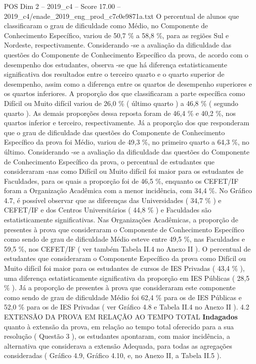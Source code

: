 \begin{textsample}{POS Dim 2 – 2019\_c4 – Score 17.00 – 2019\_c4/enade\_2019\_eng\_prod\_c7c0e9871a.txt}
O percentual de alunos que classificaram o grau de dificuldade como Médio, no Componente de Conhecimento Específico, variou de 50,7 \% a 58,8 \%, para as regiões Sul e Nordeste, respectivamente.
Considerando -se a avaliação da dificuldade das questões do Componente de Conhecimento Específico da prova, de acordo com o desempenho dos estudantes, observa -se que há diferença estatisticamente significativa dos resultados entre o terceiro quarto e o quarto superior de desempenho, assim como a diferença entre os quartos de desempenho superiores e os quartos inferiores.
A proporção dos que classificaram a parte específica como Difícil ou Muito difícil variou de 26,0 \% ( último quarto ) a 46,8 \% ( segundo quarto ).
As demais proporções dessa reposta foram de 46,4 \% e 40,2 \%, nos quartos inferior e terceiro, respectivamente.
Já a proporção dos que responderam que o grau de dificuldade das questões do Componente de Conhecimento Específico da prova foi Médio, variou de 49,3 \%, no primeiro quarto a 64,3 \%, no último.
Considerando -se a avaliação da dificuldade das questões do Componente de Conhecimento Específico da prova, o percentual de estudantes que consideraram -nas como Difícil ou Muito difícil foi maior para os estudantes de Faculdades, para os quais a proporção foi de 46,5 \%, enquanto os CEFET/IF foram a Organização Acadêmica com a menor incidência, com 34,4 \%.
No Gráfico 4.7, é possível observar que as diferenças das Universidades ( 34,7 \% ) e CEFET/IF e dos Centros Universitários ( 44,8 \% ) e Faculdades são estatisticamente significativas.
Nas Organizações Acadêmicas, a proporção de presentes à prova que consideraram o Componente de Conhecimento Específico como sendo de grau de dificuldade Médio esteve entre 49,5 \%, nas Faculdades e 59,5 \%, nos CEFET/IF ( ver também Tabela II.4 no Anexo II ).
O percentual de estudantes que consideraram o Componente Específico da prova como Difícil ou Muito difícil foi maior para os estudantes de cursos de IES Privadas ( 43,4 \% ), uma diferença estatisticamente significativa da proporção em IES Públicas ( 28,5 \% ).
Já a proporção de presentes à prova que consideraram este componente como sendo de grau de dificuldade Médio foi 62,4 \% para os de IES Públicas e 52,0 \% para os de IES Privadas ( ver Gráfico 4.8 e Tabela II.4 no Anexo II ). 4.2 EXTENSÃO DA PROVA EM RELAÇÃO AO TEMPO TOTAL \textbf{Indagados} quanto à extensão da prova, em relação ao tempo total oferecido para a sua resolução ( Questão 3 ), os estudantes apontaram, com maior incidência, a alternativa que considerava a extensão Adequada, para todas as agregações consideradas ( Gráfico 4.9, Gráfico 4.10, e, no Anexo II, a Tabela II.5 ).

\end{textsample}
